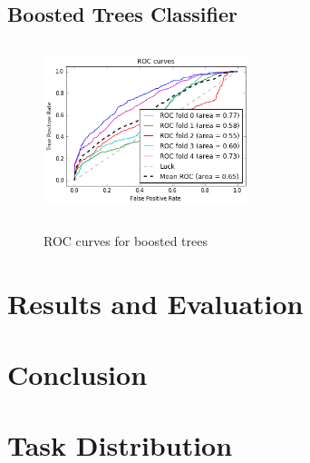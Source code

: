 \documentclass{article}
\begin{document}
		\subsection{Boosted Trees Classifier}
		\begin{figure}[H]
				\centering
				\includegraphics[width=6cm, height=5cm]{Images/boostedtrees.png}
				\label{fig:boosted_roc}
				\caption{ROC curves for boosted trees}
			\end{figure}
	\section{Results and Evaluation}
	\section{Conclusion}
	\section{Task Distribution}
\end{document}
